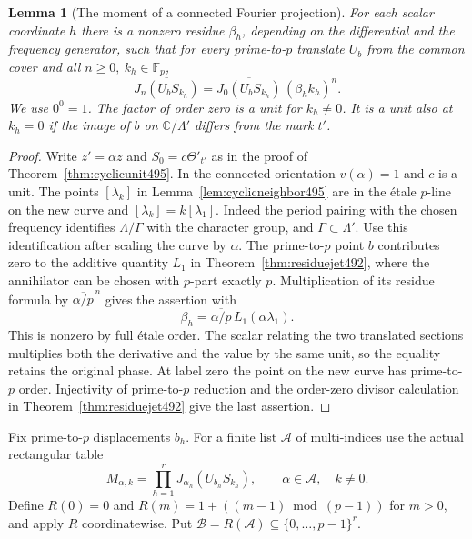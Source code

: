 \documentclass[a4paper,11pt]{article}
\newtheorem{lemma}[proposition]{Lemma}
\theoremstyle{definition}
\theoremstyle{remark}
\numberwithin{equation}{section}
\begin{document}
\begin{lemma}[The moment of a connected Fourier projection]\leavevmode
\label{lem:momentres498}
For each scalar coordinate \(h\) there is a nonzero residue
\(\beta_h\), depending on the differential and the frequency
generator, such that for every prime-to-\(p\) translate \(U_b\)
from the common cover and all \(n\ge0,\ k_h\in\mathbb F_p\),
\[
 \overline{J_n(U_b S_{k_h})}
     =\overline{J_0(U_b S_{k_h})}\,(\beta_h k_h)^n .
\]
We use \(0^0=1\). The factor of order zero is a unit for
\(k_h\ne0\). It is a unit also at \(k_h=0\) if the image of
\(b\) on \(\mathbb C/\Lambda'\) differs from the mark \(t'\).
\end{lemma}
\begin{proof}
Write \(z'=\alpha z\) and \(S_0=c\Theta'_{t'}\) as in the
proof of Theorem~\ref{thm:cyclicunit495}. In the connected
orientation \(v(\alpha)=1\) and \(c\) is a unit. The points
\([\lambda_k]\) in Lemma~\ref{lem:cyclicneighbor495} are in
the \'etale \(p\)-line on the new curve and
\([\lambda_k]=k[\lambda_1]\). Indeed the period pairing with
the chosen frequency identifies \(\Lambda/\Gamma\) with the
character group, and \(\Gamma\subset\Lambda'\).
Use this identification after scaling the curve by \(\alpha\).
The prime-to-\(p\) point \(b\) contributes zero to the additive
quantity \(L_1\) in Theorem~\ref{thm:residuejet492}, where the
annihilator can be chosen with \(p\)-part exactly \(p\).
Multiplication of its residue formula by
\(\overline{\alpha/p}^{\,n}\) gives the assertion with
\[
          \beta_h=\overline{\alpha/p}\, L_1(\alpha\lambda_1).
\]
This is nonzero by full \'etale order. The scalar relating the
two translated sections multiplies both the derivative and
the value by the same unit, so the equality retains the
original phase. At label zero the point on the new curve has
prime-to-\(p\) order. Injectivity of prime-to-\(p\) reduction
and the order-zero divisor calculation in
Theorem~\ref{thm:residuejet492} give the last assertion.
\end{proof}

Fix prime-to-\(p\) displacements \(b_h\). For a finite list
\(\mathcal A\) of multi-indices use the actual rectangular table
\[
   M_{\alpha,k}=\prod_{h=1}^r J_{\alpha_h}(U_{b_h}S_{k_h}),
           \qquad \alpha\in\mathcal A,\quad k\ne0 .
\]
Define \(R(0)=0\) and \(R(m)=1+((m-1)\bmod(p-1))\) for
\(m>0\), and apply \(R\) coordinatewise. Put
\(\mathcal B=R(\mathcal A)\subseteq\{0,\ldots,p-1\}^r\).
\end{document}
